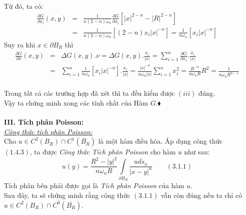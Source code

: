 Từ đó, ta có:
\begin{eqnarray}
\frac{{\partial G}}
{{\partial x_i }}\left( {x,y} \right)& =& \frac{1}
{{n\left( {2 - n} \right)\omega _n }}\frac{{\partial G}}
{{\partial x_i }}\left[ {\left| x \right|^{2 - n}  - \left| R \right|^{2 - n} } \right]\nonumber\\
& = &\frac{1}
{{n\left( {2 - n} \right)\omega _n }}\left[ {\left( {2 - n} \right)x_i \left| x \right|^{ - n} } \right] = \frac{1}
{{n\omega _n }}\left[ {x_i \left| x \right|^{ - n} } \right]\nonumber
\end{eqnarray}
Suy ra khi $
x \in \partial B_R 
$ thì
\begin{eqnarray}
\frac{{\partial G}}
{{\partial \nu }}\left( {x,y} \right)& = &\Delta G\left( {x,y} \right).\nu  = \Delta G\left( {x,y} \right).\frac{{x_i }}
{{\left| x \right|}} = \sum\limits_{i = 1}^n {\frac{{\partial G}}
{{\partial x_i }}.} \frac{{x_i }}
{{\left| x \right|}}\nonumber\\
 &= &\sum\limits_{i = 1}^n {\frac{1}
{{n\omega _n }}\left[ {x_i \left| x \right|^{ - n} } \right].} \frac{{x_i }}
{{\left| x \right|}} = \frac{{\left| x \right|^{ - n} }}
{{n\omega _n \left| x \right|}}\sum\limits_{i = 1}^n {x_i^2 }  = \frac{{R^{ - n} }}
{{n\omega _n R}}R^2  = \frac{1}
{{n\omega _n R^{n - 1} }}\nonumber
\end{eqnarray}
\\Trong tất cả các trường hợp đã xét thì ta đều kiểm được $
\left( {iii} \right)
$ đúng.
\\Vậy ta chứng minh xong các tính chất của Hàm $G$.$\blacklozenge$\\ \\
\textbf{III. Tích phân Poisson:}
\\ \textit{\underline{Công thức tích phân Poisson:} }
\\Cho $
u \in C^2 \left( {B_R } \right) \cap C^1 \left( {\overline {B_R } } \right)
$ là một hàm điều hòa. Áp dụng công thức $
\left( {1.4.3} \right)
$, ta được {\it Công thức Tích phân Poisson} cho hàm $u$ như sau:
\[
u\left( y \right) = \frac{{R^2  - \left| y \right|^2 }}
{{n\omega _n R}}\int\limits_{\partial B_R } {\frac{{uds_x }}
{{\left| {x - y} \right|^n }}} \quad \quad \left( {3.1.1} \right)
\]
Tích phân bên phải được gọi là {\it Tích phân Poisson} của hàm $u$.\\
Sau đây, ta sẽ chứng minh rằng công thức $
\left( {3.1.1} \right)
$ vẫn còn đúng nếu ta chỉ có $
u \in C^2 \left( {B_R } \right) \cap C^0 \left( {\overline {B_R } } \right)
$.\\
